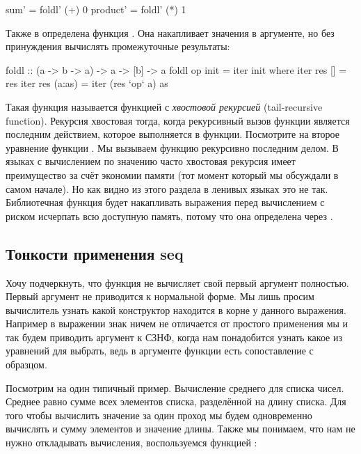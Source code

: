 \begin{code}
sum'        = foldl' (+) 0
product'    = foldl' (*) 1
\end{code}


Также в  определена функция . 
Она накапливает значения в аргументе, но без принуждения вычислять 
промежуточные результаты:

\begin{code}
foldl :: (a -> b -> a) -> a -> [b] -> a
foldl op init = iter init
    where iter res []        = res
          iter res (a:as)    = iter (res `op` a) as 
\end{code}

Такая функция называется функцией с \emph{хвостовой рекурсией}
(tail-recursive function). Рекурсия хвостовая тогда, когда 
рекурсивный вызов функции является последним действием, которое 
выполняется в функции. Посмотрите на второе уравнение функции
. Мы вызываем функцию  рекурсивно последним
делом. В языках с вычислением по значению часто хвостовая рекурсия
имеет преимущество за счёт экономии памяти (тот момент который
мы обсуждали в самом начале). Но как видно из этого раздела
в ленивых языках это не так. Библиотечная функция 
будет накапливать выражения перед вычислением с риском
исчерпать всю доступную память, потому что она
определена через .

\subsection{Тонкости применения seq}

Хочу подчеркнуть, что функция  не вычисляет 
свой первый аргумент полностью. Первый аргумент не приводится
к нормальной форме. Мы лишь просим вычислитель узнать какой 
конструктор находится в корне у данного выражения.
Например в выражении  знак
\In{$!} ничем не отличается от простого применения мы
и так будем приводить аргумент  к СЗНФ,
когда нам понадобится узнать какое из уравнений для 
 выбрать, ведь в аргументе функции 
есть сопоставление с образцом.

Посмотрим на один типичный пример. Вычисление среднего
для списка чисел. Среднее равно сумме всех элементов
списка, разделённой на длину списка. Для того
чтобы вычислить значение за один проход мы будем
одновременно вычислять и сумму элементов и значение
длины. Также мы понимаем, что нам не нужно откладывать
вычисления, воспользуемся функцией :


